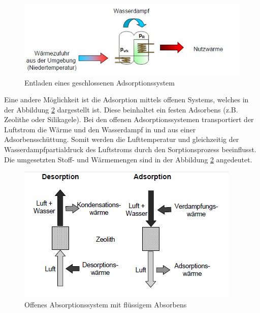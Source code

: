 \documentclass[11pt,a4paper]{scrartcl}
\begin{document}
\begin{figure}[h!]
\begin{center}
\includegraphics[scale=0.6]{images/geschlossenerentladen.jpg}
\caption{Entladen eines geschlossenen Adsorptionssystem \cite{zeosys}}
\label{fig:geschlossenerentladen}
\end{center}
\end{figure}


Eine andere Möglichkeit ist die Adsorption mittels offenen Systems, welches in
der Abbildung \ref{fig:offenessystemadsorption} dargestellt ist. Diese
beinhaltet ein festen Adsorbens (z.B. Zeolithe oder Silikagele).  Bei den
offenen Adsorptionssystemen transportiert der Luftstrom die Wärme und den
Wasserdampf in und aus einer Adsorbensschüttung. Somit werden die Lufttemperatur
und gleichzeitig der Wasserdampfpartialdruck des Luftstroms durch den
Sorptionsprozess beeinflusst. Die umgesetzten Stoff- und Wärmemengen sind in der
Abbildung \ref{fig:offenessystemadsorption} angedeutet.


\begin{figure}[h!]
\begin{center}
\includegraphics[scale=1]{images/offenessystemadsorption.jpg}
\caption{Offenes Absorptionssystem mit flüssigem Absorbens \cite{Ferdinandschmidt}}
\label{fig:offenessystemadsorption}
\end{center}
\end{figure}
\end{document}
